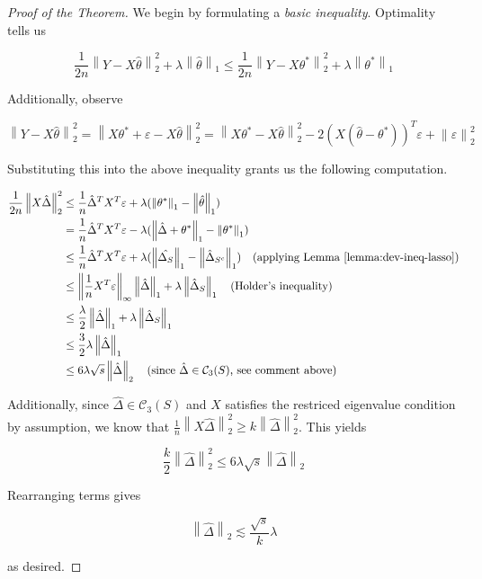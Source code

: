 \documentclass{article}
\newcommand{\cC}{\mathcal{C}}
\newcommand{\norm}[1]{\left\|#1\right\|}
\newcommand{\eps}{\varepsilon} %
\begin{document}
\begin{proof}[Proof of the Theorem]

  We begin by formulating a \textit{basic inequality}. Optimality tells us

  $$\frac{1}{2n}\norm{Y - X\hat{\theta}}_{2}^{2} + \lambda\norm{\hat{\theta}}_{1} \leq \frac{1}{2n}\norm{Y - X\theta^{*}}_{2}^{2} + \lambda\norm{\theta^{*}}_{1}$$

  Additionally, observe

  $$\norm{Y - X\hat{\theta}}_{2}^{2} = \norm{X\theta^{*} + \eps - X\hat{\theta}}_{2}^{2} = \norm{X\theta^{*} - X\hat{\theta}}_{2}^{2} - 2(X(\hat{\theta} - \theta^{*}))^{T}\eps + \norm{\eps}_{2}^{2}$$

  Substituting this into the above inequality grants us the following computation.

  \begin{align*}
    \frac{1}{2n}\norm{X\hat{\Delta}}_{2}^{2}
    &\leq \frac1n\hat{\Delta}^{T}X^{T}\eps + \lambda (\norm{\theta^{*}}_{1} - \norm{\hat{\theta}}_{1}) \\
    &= \frac1n\hat{\Delta}^{T}X^{T}\eps - \lambda (\norm{\hat{\Delta} + \theta^{*}}_{1} - \norm{\theta^{*}}_{1}) \\
    &\leq \frac1n\hat{\Delta}^{T}X^{T}\eps + \lambda(\norm{\hat{\Delta_{S}}}_{1} - \norm{\hat{\Delta}_{S^{c}}}_{1}) \quad \textrm{(applying Lemma \ref{lemma:dev-ineq-lasso})} \\
    &\leq \norm{\frac1nX^{T}\eps}_{\infty}\norm{\hat{\Delta}}_{1} + \lambda\norm{\hat{\Delta}_{S}}_{1} \quad \textrm{(Holder's inequality)} \\
    &\leq \frac{\lambda}{2}\norm{\hat{\Delta}}_{1} + \lambda\norm{\hat{\Delta}_{S}}_{1} \\
    &\leq \frac32 \lambda \norm{\hat{\Delta}}_{1} \\
    &\leq 6\lambda\sqrt{s}\norm{\hat{\Delta}}_{2} \quad \textrm{(since $\hat{\Delta} \in \cC_{3}(S)$, see comment above)}
  \end{align*}

  Additionally, since $\hat{\Delta} \in \cC_{3}(S)$ and $X$ satisfies the restriced eigenvalue condition by assumption, we know that $\frac1n\norm{X\hat{\Delta}}_{2}^{2} \geq k\norm{\hat{\Delta}}^{2}_{2}$. This yields

  $$\frac{k}{2}\norm{\hat{\Delta}}_{2}^{2} \leq 6\lambda\sqrt{s}\norm{\hat{\Delta}}_{2}$$

  Rearranging terms gives 

  $$\norm{\hat{\Delta}}_2 \lesssim \frac{\sqrt{s}}{k}\lambda$$

  as desired.

\end{proof}
\end{document}

